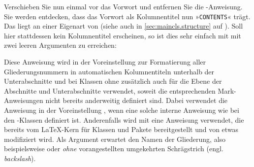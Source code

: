\begin{Example}
      Verschieben Sie nun einmal %
       vor das Vorwort und
      entfernen Sie die -Anweisung. Sie werden entdecken, dass
      das Vorwort als Kolumnentitel nun »\texttt{CONTENTS}« trägt. Das liegt
      an einer Eigenart von %
       (siehe
      auch in \autoref{sec:maincls.structure} auf
      ). Soll hier stattdessen kein
      Kolumnentitel erscheinen, so ist dies sehr einfach mit 
      mit zwei leeren Argumenten zu erreichen:
    \end{Example}
  \fi%
  \EndIndexGroup
\fi


  \begin{Declaration}
  \end{Declaration}
  Diese Anweisung wird in der Voreinstellung zur Formatierung aller
  Gliederungsnummern in automatischen Kolumnentiteln unterhalb der
  Unterabschnitte und bei Klassen ohne 
  zusätzlich auch für die Ebene der Abschnitte und Unterabschnitte verwendet,
  soweit die entsprechenden Mark-Anweisungen nicht bereits anderweitig
  definiert sind. Dabei verwendet die Anweisung in der Voreinstellung
  , wenn eine solche interne Anweisung
  wie bei den \KOMAScript-Klassen definiert ist. Anderenfalls wird mit
  eine Anweisung verwendet, die bereits vom \LaTeX-Kern für Klassen und Pakete
  bereitgestellt und von \KOMAScript{} etwas modifiziert wird. Als Argument
  erwartet  den Namen der Gliederung, also
  beispielsweise  oder  \emph{ohne}
  vorangestellten umgekehrten Schrägstrich (engl. \emph{backslash}).

